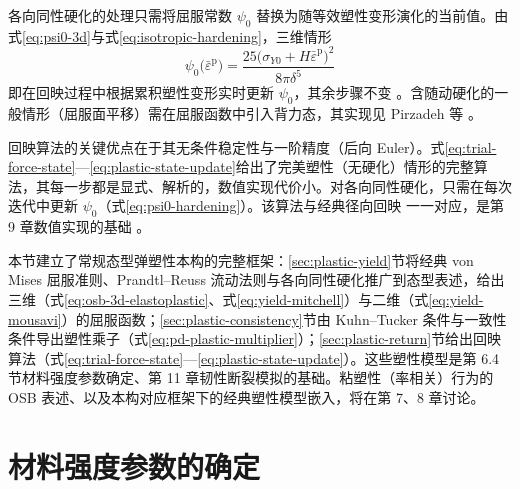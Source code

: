 各向同性硬化的处理只需将屈服常数 $\psi_{0}$ 替换为随等效塑性变形演化的当前值。由式\eqref{eq:psi0-3d}与式\eqref{eq:isotropic-hardening}，三维情形
\begin{equation}
  \psi_{0}\bigl(\bar{\varepsilon}^{\mathrm{p}}\bigr)=
  \frac{25\bigl(\sigma_{Y0}+H\bar{\varepsilon}^{\mathrm{p}}\bigr)^{2}}{8\pi\delta^{5}}
  \label{eq:psi0-hardening}
\end{equation}
即在回映过程中根据累积塑性变形实时更新 $\psi_{0}$，其余步骤不变 \cite{Mitchell2011,MadenciOterkus2016}。含随动硬化的一般情形（屈服面平移）需在屈服函数中引入背力态，其实现见 Pirzadeh 等 \cite{Pirzadeh2024}。

\begin{remark}
  回映算法的关键优点在于其无条件稳定性与一阶精度（后向 Euler）。式\eqref{eq:trial-force-state}—\eqref{eq:plastic-state-update}给出了完美塑性（无硬化）情形的完整算法，其每一步都是显式、解析的，数值实现代价小。对各向同性硬化，只需在每次迭代中更新 $\psi_{0}$（式\eqref{eq:psi0-hardening}）。该算法与经典径向回映 \cite{SimoHughes1998} 一一对应，是第 9 章数值实现的基础 \cite{Mitchell2011,Mousavi2021}。
\end{remark}

本节建立了常规态型弹塑性本构的完整框架：\ref{sec:plastic-yield}节将经典 von Mises 屈服准则、Prandtl–Reuss 流动法则与各向同性硬化推广到态型表述，给出三维（式\eqref{eq:osb-3d-elastoplastic}、式\eqref{eq:yield-mitchell}）与二维（式\eqref{eq:yield-mousavi}）的屈服函数；\ref{sec:plastic-consistency}节由 Kuhn–Tucker 条件与一致性条件导出塑性乘子（式\eqref{eq:pd-plastic-multiplier}）；\ref{sec:plastic-return}节给出回映算法（式\eqref{eq:trial-force-state}—\eqref{eq:plastic-state-update}）。这些塑性模型是第 6.4 节材料强度参数确定、第 11 章韧性断裂模拟的基础。粘塑性（率相关）行为的 OSB 表述、以及本构对应框架下的经典塑性模型嵌入，将在第 7、8 章讨论。


\section{材料强度参数的确定}\label{sec:strength-params}


